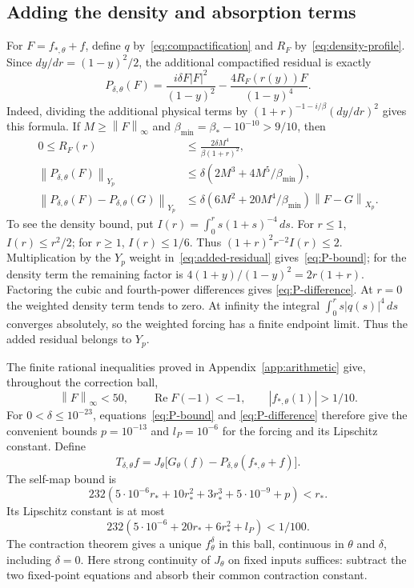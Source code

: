 \documentclass[11pt]{article}
\numberwithin{equation}{section}
\theoremstyle{remark}
\newcommand{\norm}[1]{\left\|#1\right\|}
\DeclareMathOperator{\Rea}{Re}
\begin{document}
\subsection{Adding the density and absorption terms}

For $F=f_{*,\theta}+f$, define $q$ by~\eqref{eq:compactification} and
$R_F$ by~\eqref{eq:density-profile}. Since $dy/dr=(1-y)^2/2$,
the additional compactified residual is exactly
\begin{equation}\label{eq:added-residual}
 P_{\delta,\theta}(F)
   =\frac{i\delta F|F|^2}{(1-y)^2}
       -\frac{4R_F(r(y))F}{(1-y)^4}.
\end{equation}
Indeed, dividing the additional physical terms by
$(1+r)^{-1-i/\beta}(dy/dr)^2$ gives this formula.
If $M\ge\norm F_\infty$ and $\beta_{\min}=\beta_*-10^{-10}>9/10$,
then
\begin{align}
 0\le R_F(r)&\le\frac{2\delta M^4}{\beta(1+r)^2},\label{eq:R-bound}\\
 \norm{P_{\delta,\theta}(F)}_{Y_p}
   &\le\delta(2M^3+4M^5/\beta_{\min}),\label{eq:P-bound}\\
 \norm{P_{\delta,\theta}(F)-P_{\delta,\theta}(G)}_{Y_p}
   &\le\delta(6M^2+20M^4/\beta_{\min})\norm{F-G}_{X_p}.
   \label{eq:P-difference}
\end{align}
To see the density bound, put $I(r)=\int_0^r s(1+s)^{-4}\,ds$.
For $r\le1$, $I(r)\le r^2/2$; for $r\ge1$, $I(r)\le1/6$.
Thus $(1+r)^2r^{-2}I(r)\le2$. Multiplication by the $Y_p$ weight
in~\eqref{eq:added-residual} gives~\eqref{eq:P-bound}; for the density
term the remaining factor is $4(1+y)/(1-y)^2=2r(1+r)$.
Factoring the cubic and fourth-power differences gives
\eqref{eq:P-difference}.
At $r=0$ the weighted density term tends to zero. At infinity the integral
$\int_0^r s|q(s)|^4\,ds$ converges absolutely, so the weighted forcing has
a finite endpoint limit. Thus the added residual belongs to $Y_p$.

The finite rational inequalities proved in Appendix~\ref{app:arithmetic}
give, throughout the correction ball,
\begin{equation}\label{eq:profile-envelopes}
 \norm F_\infty<50,\qquad \Rea F(-1)<-1,
 \qquad |f_{*,\theta}(1)|>1/10.
\end{equation}
For $0<\delta\le10^{-23}$, equations~\eqref{eq:P-bound} and
\eqref{eq:P-difference} therefore give the convenient bounds
$p=10^{-13}$ and $l_P=10^{-6}$ for the forcing and its Lipschitz constant.
Define
\[
 T_{\delta,\theta}f
  =J_\theta\bigl[G_\theta(f)
       -P_{\delta,\theta}(f_{*,\theta}+f)\bigr].
\]
The self-map bound is
\[
 232(5\cdot10^{-6}r_*+10r_*^2+3r_*^3+5\cdot10^{-9}+p)<r_*.
\]
Its Lipschitz constant is at most
\begin{equation}\label{eq:profile-contraction}
 232(5\cdot10^{-6}+20r_*+6r_*^2+l_P)<1/100.
\end{equation}
The contraction theorem gives a unique $f_\theta^\delta$ in this ball,
continuous in $\theta$ and $\delta$, including $\delta=0$.
Here strong continuity of $J_\theta$ on fixed inputs suffices: subtract
the two fixed-point equations and absorb their common contraction constant.
\end{document}
